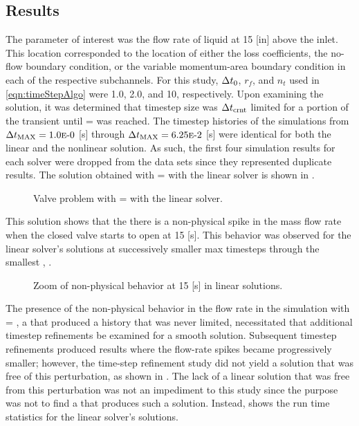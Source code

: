 \subsection{Results}
\label{subsect:valveResults}

The parameter of interest was the flow  rate of liquid at 15 [in] above the inlet.
This location corresponded to the location of either the loss coefficients, the no-flow boundary condition, or the variable momentum-area boundary condition in each of the respective subchannels.
For this study, $\dt{}_{0}$, $r_{f}$, and $n_{t}$ used in \eqref{eqn:timeStepAlgo} were 1.0, 2.0, and 10, respectively.
Upon examining the solution, it was determined that timestep size was $\dtcrnt{}$ limited for a portion of the transient until \dtmax{} =  was reached.
The timestep histories of the simulations from $\dtmax{} = \expneg{1.0}{0}$ [s] through $\dtmax{} = \expneg{6.25}{2}$ [s] were identical for both the linear and the nonlinear solution.
As such, the first four simulation results for each solver were dropped from the data sets since they represented duplicate results.
The solution obtained with \dtmax{} =  with the linear solver is shown in .

\begin{figure}[h!tb]
\centering

\caption{Valve problem with \dtmax{} =  with the linear solver.}
\label{fig:valveLin6pt25em02}
\end{figure}

This solution shows that the there is a non-physical spike in the mass flow rate when the closed valve starts to open at 15 [s].
This behavior was observed for the linear solver's solutions at successively smaller max timesteps through the smallest \dtmax{}, .

\begin{figure}[h!tb]
\centering

\caption{Zoom of non-physical behavior at 15 [s] in linear solutions.}
\label{fig:valveLinSols}
\end{figure}

The presence of the non-physical behavior in the flow rate in the simulation with \dtmax{} = , a \dtmax{} that produced a \dt{} history that was never \dtcrnt{} limited, necessitated that additional timestep refinements be examined for a smooth solution.
Subsequent timestep refinements produced results where the flow-rate spikes became progressively smaller; however, the time-step refinement study did not yield a solution that was free of this perturbation, as shown in .
The lack of a linear solution that was free from this perturbation was not an impediment to this study since the purpose was not to find a \dtmax{} that produces such a solution.
Instead,  shows the run time statistics for the linear solver's solutions.

